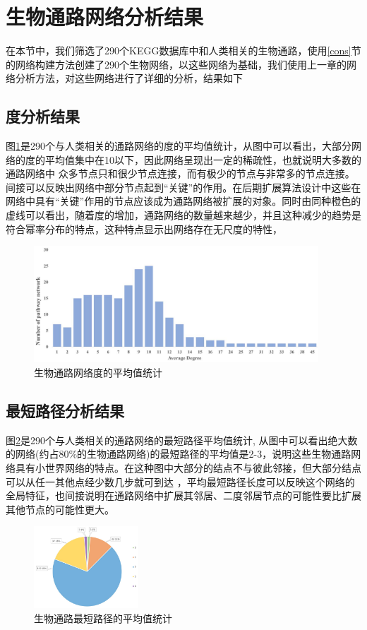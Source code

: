 \section{生物通路网络分析结果}
在本节中，我们筛选了290个KEGG\cite{}数据库中和人类相关的生物通路，使用\ref{cons}节的网络构建方法创建了290个生物网络，以这些网络为基础，我们使用上一章的网络分析方法，对这些网络进行了详细的分析，结果如下
\subsection{度分析结果}
图\ref{fig26}是290个与人类相关的通路网络的度的平均值统计，从图中可以看出，大部分网络的度的平均值集中在10以下，因此网络呈现出一定的稀疏性，也就说明大多数的通路网络中 众多节点只和很少节点连接，而有极少的节点与非常多的节点连接。间接可以反映出网络中部分节点起到“关键”的作用。在后期扩展算法设计中这些在网络中具有“关键”作用的节点应该成为通路网络被扩展的对象。同时由同种橙色的虚线可以看出，随着度的增加，通路网络的数量越来越少，并且这种减少的趋势是符合幂率分布的特点，这种特点显示出网络存在无尺度的特性，

\begin{figure}[h]
\centering
\includegraphics[width = 0.95\textwidth]{degree_dis}
\caption[fig26]{生物通路网络度的平均值统计}
\label{fig26}
\end{figure}

\subsection{最短路径分析结果}
图\ref{fig27}是290个与人类相关的通路网络的最短路径平均值统计, 从图中可以看出绝大数的网络(约占80\%的生物通路网络)的最短路径的平均值是2-3，说明这些生物通路网络具有小世界网络\cite{}的特点。在这种图中大部分的结点不与彼此邻接，但大部分结点可以从任一其他点经少数几步就可到达 ，平均最短路径长度可以反映这个网络的全局特征，也间接说明在通路网络中扩展其邻居、二度邻居节点的可能性要比扩展其他节点的可能性更大。

\begin{figure}[h]
\centering
\includegraphics[width = 0.35\textwidth]{pie}
\caption[fig27]{生物通路最短路径的平均值统计}
\label{fig27}
\end{figure}

